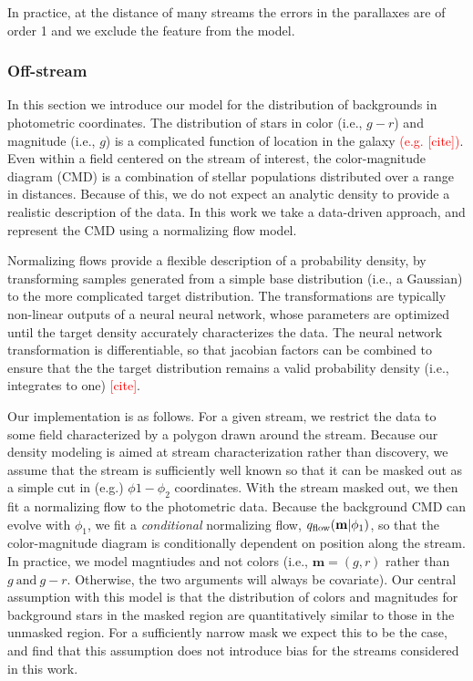 \documentclass[twocolumn]{aastex631}
\newcommand{\TODO}[1]{{\textcolor{red}{#1}}}
\begin{document}
            In practice, at the distance of many streams the errors in the parallaxes are of order 1 and we exclude the feature from the model.

    
        \subsubsection{Off-stream} \label{sub:photometric_model_off_stream}
            In this section we introduce our model for the distribution of backgrounds in photometric coordinates. 
            The distribution of stars in color (i.e., $g-r$) and magnitude (i.e., $g$) is a complicated function of location in the galaxy \TODO{(e.g. [cite])}. Even within a field centered on the stream of interest, the color-magnitude diagram (CMD) is a combination of stellar populations distributed over a range in distances. Because of this, we do not expect an analytic density to provide a realistic description of the data. In this work we take a data-driven approach, and represent the CMD using a normalizing flow model.

            Normalizing flows provide a flexible description of a probability density, by transforming samples generated from a simple base distribution (i.e., a Gaussian) to the more complicated target distribution. The transformations are typically non-linear outputs of a neural neural network, whose parameters are optimized until the target density accurately characterizes the data. The neural network transformation is differentiable, so that jacobian factors can be combined to ensure that the the target distribution remains a valid probability density (i.e., integrates to one) \TODO{[cite]}.  

            Our implementation is as follows. For a given stream, we restrict the data to some field characterized by a polygon drawn around the stream. Because our density modeling is aimed at stream characterization rather than discovery, we assume that the stream is sufficiently well known so that it can be masked out as a simple cut in (e.g.) $\phi1-\phi_2$ coordinates. With the stream masked out, we then fit a normalizing flow to the photometric data. Because the background CMD can evolve with $\phi_1$, we fit a \emph{conditional} normalizing flow, $q_{\rm flow}(\mathbf{m}|\phi_1)$, so that the color-magnitude diagram is conditionally dependent on position along the stream. In practice, we model magntiudes and not colors (i.e., $\mathbf{m} = (g,r)$ rather than $g \ \mathrm{and} \ g-r$. Otherwise, the two arguments will always be covariate). Our central assumption with this model is that the distribution of colors and magnitudes for background stars in the masked region are quantitatively similar to those in the unmasked region. For a sufficiently narrow mask we expect this to be the case, and find that this assumption does not introduce bias for the streams considered in this work.
                
\end{document}
